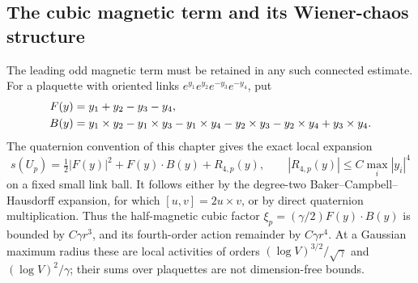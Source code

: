 \documentclass[11pt,oneside,openany]{book}
\theoremstyle{definition}
\theoremstyle{remark}
\begin{document}
\subsection{The cubic magnetic term and its Wiener-chaos structure}
\label{sec:native-cubic-chaos}
The leading odd magnetic term must be retained in any such connected
estimate. For a plaquette with oriented links
$e^{y_1}e^{y_2}e^{-y_3}e^{-y_4}$, put
\begin{align}
 F(y)&=y_1+y_2-y_3-y_4,\notag\\
 B(y)&=y_1\mathbin\times y_2-y_1\mathbin\times y_3
       -y_1\mathbin\times y_4-y_2\mathbin\times y_3
       -y_2\mathbin\times y_4+y_3\mathbin\times y_4.
 \label{eq:native-plaquette-cubic-polynomial}
\end{align}
The quaternion convention of this chapter gives the exact local
expansion
\begin{equation}
 s(U_p)=\tfrac12|F(y)|^2+F(y)\cdot B(y)+R_{4,p}(y),\qquad
 |R_{4,p}(y)|\le C\max_i|y_i|^4
 \label{eq:native-plaquette-cubic-expansion}
\end{equation}
on a fixed small link ball. It follows either by the degree-two
Baker--Campbell--Hausdorff expansion, for which
$[u,v]=2u\times v$, or by direct quaternion multiplication. Thus the
half-magnetic cubic factor
$\xi_p=(\gamma/2)F(y)\cdot B(y)$ is bounded by $C\gamma r^3$,
and its fourth-order action remainder by $C\gamma r^4$. At a
Gaussian maximum radius these are local activities of orders
$(\log V)^{3/2}/\sqrt\gamma$ and $(\log V)^2/\gamma$; their
sums over plaquettes are not dimension-free bounds.
\end{document}
